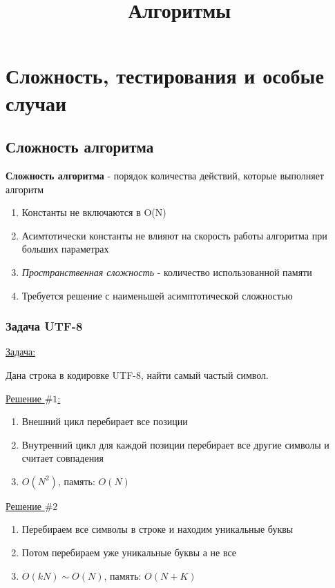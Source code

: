 \documentclass[a4paper, 12pt]{article}
\title{Алгоритмы}
\begin{document}
\maketitle

\section{Сложность, тестирования и особые случаи}

\subsection{Сложность алгоритма}

\textbf{Сложность алгоритма} - порядок количества действий, 
которые выполняет алгоритм

\begin{enumerate}
    \item Константы не включаются в O(N)
    \item Асимтотически константы не влияют на скорость
    работы алгоритма при больших параметрах
    \item \textit{Пространственная сложность} - количество использованной
    памяти
    \item Требуется решение с наименьшей асимптотической сложностью
\end{enumerate}

\subsubsection{Задача UTF-8}

\underline{Задача:} 

Дана строка в кодировке UTF-8, найти
самый частый символ.

\underline{Решение $\#1$:}

\begin{enumerate}
    \item Внешний цикл перебирает все позиции
    \item Внутренний цикл для каждой позиции перебирает
    все другие символы и считает совпадения
    \item $O(N^{2})$, память: $O(N)$
\end{enumerate}

\underline{Решение $\#2$}

\begin{enumerate}
    \item Перебираем все символы в строке и
    находим уникальные буквы
    \item Потом перебираем уже уникальные буквы а не все
    \item $O(kN) \sim O(N)$, память: $O(N + K)$
\end{enumerate}
\end{document}
